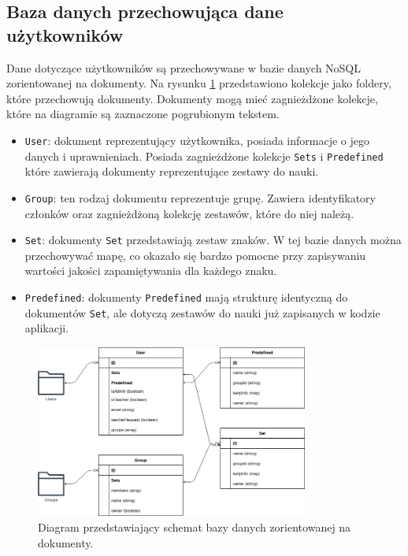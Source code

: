 \documentclass[a4paper,twoside,12pt]{book}
\begin{document}
\subsection{Baza danych przechowująca dane użytkowników}

Dane dotyczące użytkowników są przechowywane w bazie danych NoSQL zorientowanej na dokumenty. Na rysunku \ref{fig:firestore} przedstawiono kolekcje jako foldery, które przechowują dokumenty. Dokumenty mogą mieć zagnieżdżone kolekcje, które na diagramie są zaznaczone pogrubionym tekstem. 

\begin{itemize}
\item \texttt{User}: dokument reprezentujący użytkownika, posiada informacje o jego danych i uprawnieniach. Posiada zagnieżdżone kolekcje \texttt{Sets} i \texttt{Predefined} które zawierają dokumenty reprezentujące zestawy do nauki.
\item \texttt{Group}: ten rodzaj dokumentu reprezentuje grupę. Zawiera identyfikatory członków oraz zagnieżdżoną kolekcję zestawów, które do niej należą.
\item \texttt{Set}: dokumenty \texttt{Set} przedstawiają zestaw znaków. W tej bazie danych można przechowywać mapę, co okazało się bardzo pomocne przy zapisywaniu wartości jakości zapamiętywania dla każdego znaku.
\item \texttt{Predefined}: dokumenty \texttt{Predefined} mają strukturę identyczną do dokumentów \texttt{Set}, ale dotyczą zestawów do nauki już zapisanych w kodzie aplikacji.
\end{itemize}

\begin{figure}[]
\centering
\includegraphics[width=0.8\textwidth]{firestore.drawio}
\caption{Diagram przedstawiający schemat bazy danych zorientowanej na dokumenty.}
\label{fig:firestore}
\end{figure}
\end{document}
